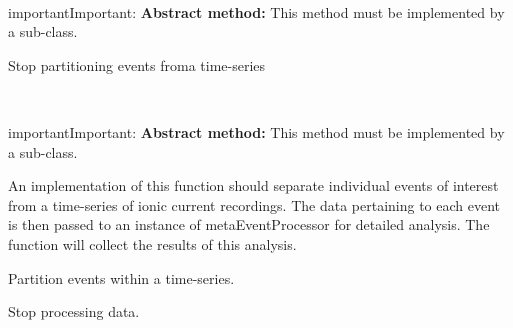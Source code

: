 \documentclass[letterpaper,10pt,english]{sphinxmanual}
\begin{document}
\begin{fulllineitems}

\begin{fulllineitems}
\label{api-doc/mosaic.meta:mosaic.metaEventPartition.metaEventPartition._stop}~
\begin{notice}{important}{Important:}
\textbf{Abstract method:} This method must be implemented by a sub-class.
\end{notice}

Stop partitioning events froma time-series

\end{fulllineitems}


\begin{fulllineitems}
\label{api-doc/mosaic.meta:mosaic.metaEventPartition.metaEventPartition._eventsegment}~
\begin{notice}{important}{Important:}
\textbf{Abstract method:} This method must be implemented by a sub-class.
\end{notice}

An implementation of this function should separate individual events of interest from a time-series of ionic current recordings. The data pertaining to each event is then passed               to an instance of metaEventProcessor for detailed analysis. The function will collect the results of this analysis.

\end{fulllineitems}


\begin{fulllineitems}
\label{api-doc/mosaic.meta:mosaic.metaEventPartition.metaEventPartition.PartitionEvents}
Partition events within a time-series.

\end{fulllineitems}


\begin{fulllineitems}
\label{api-doc/mosaic.meta:mosaic.metaEventPartition.metaEventPartition.Stop}
Stop processing data.


\end{fulllineitems}
\end{fulllineitems}
\end{document}
